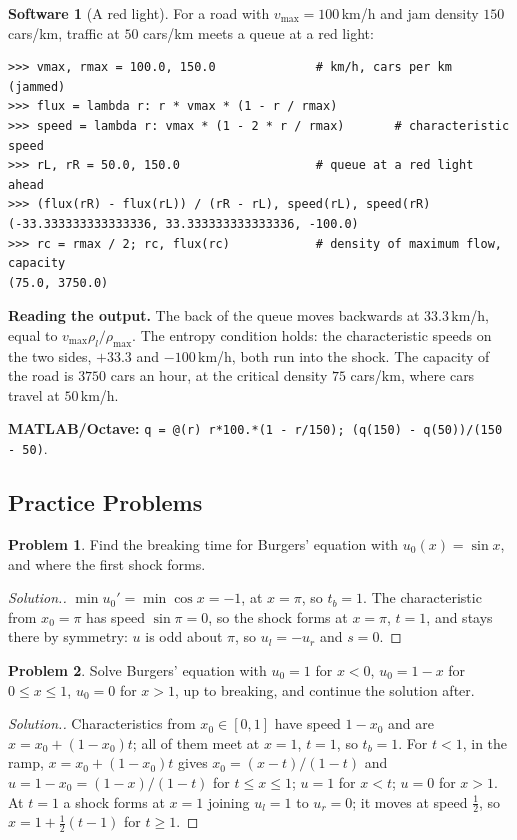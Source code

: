 \documentclass[11pt,a4paper]{article}
\numberwithin{equation}{section}
\theoremstyle{definition}
\newtheorem{software}[thm]{Software}
\newtheorem{problemx}{Problem}[subsection]
\newenvironment{problem}{\begin{problemx}}{\end{problemx}}
\newenvironment{solution}
  {\renewcommand{\qedsymbol}{}\begin{proof}[\textit{Solution}.]}
  {\end{proof}}
\begin{document}
\begin{software}[A red light]
\label{sw:traffic}
For a road with $v_{\max} = 100$\,km/h and jam density $150$ cars/km, traffic at $50$ cars/km meets a queue at a red light:
{\small\begin{verbatim}
>>> vmax, rmax = 100.0, 150.0              # km/h, cars per km (jammed)
>>> flux = lambda r: r * vmax * (1 - r / rmax)
>>> speed = lambda r: vmax * (1 - 2 * r / rmax)       # characteristic speed
>>> rL, rR = 50.0, 150.0                   # queue at a red light ahead
>>> (flux(rR) - flux(rL)) / (rR - rL), speed(rL), speed(rR)
(-33.333333333333336, 33.333333333333336, -100.0)
>>> rc = rmax / 2; rc, flux(rc)            # density of maximum flow, capacity
(75.0, 3750.0)
\end{verbatim}}
\textbf{Reading the output.} The back of the queue moves backwards at $33.3$\,km/h, equal to $v_{\max}\rho_l/\rho_{\max}$. The entropy condition holds: the characteristic speeds on the two sides, $+33.3$ and $-100$\,km/h, both run into the shock. The capacity of
the road is $3750$ cars an hour, at the critical density $75$ cars/km, where cars travel at $50$\,km/h.

\textbf{MATLAB/Octave:} \texttt{q = @(r) r*100.*(1 - r/150); (q(150) - q(50))/(150 - 50)}.
\end{software}

\subsection{Practice Problems}

\begin{problem}
Find the breaking time for Burgers' equation with $u_0(x) = \sin x$, and where the first shock forms.
\end{problem}

\begin{solution}
$\min u_0' = \min\cos x = -1$, at $x = \pi$, so $t_b = 1$. The characteristic from $x_0 = \pi$ has speed $\sin\pi = 0$, so the shock forms at $x = \pi$, $t = 1$, and stays there by symmetry: $u$ is odd about $\pi$, so $u_l = -u_r$ and
$s = 0$.
\end{solution}

\begin{problem}
Solve Burgers' equation with $u_0 = 1$ for $x < 0$, $u_0 = 1 - x$ for $0 \leq x \leq 1$, $u_0 = 0$ for $x > 1$, up to breaking, and continue the solution after.
\end{problem}

\begin{solution}
Characteristics from $x_0 \in [0, 1]$ have speed $1 - x_0$ and are $x = x_0 + (1 - x_0)t$; all of them meet at $x = 1$, $t = 1$, so $t_b = 1$. For $t < 1$, in the ramp, $x = x_0 + (1 - x_0)t$ gives $x_0 = (x - t)/(1 - t)$ and
$u = 1 - x_0 = (1 - x)/(1 - t)$ for $t \leq x \leq 1$; $u = 1$ for $x < t$; $u = 0$ for $x > 1$. At $t = 1$ a shock forms at $x = 1$ joining $u_l = 1$ to $u_r = 0$; it moves at speed $\frac12$, so $x = 1 + \frac12(t - 1)$ for $t \geq 1$.
\end{solution}
\end{document}

